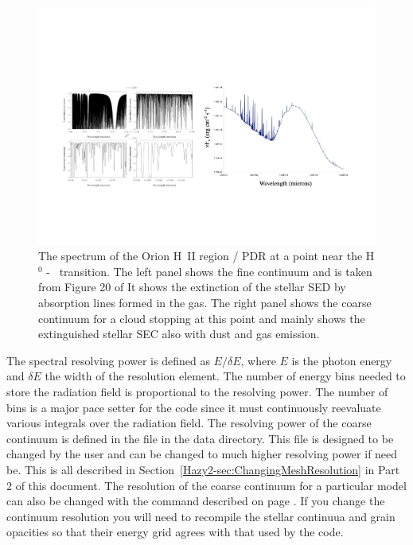 \begin{figure}
\centering
\includegraphics[scale=0.6]{CoarseFineContinua}
\caption[Orion Spectrum]{\label{fig:CoarseFineContinua}The spectrum of the Orion H~II region / PDR
at a point near the H$^0$ - \htwo\ transition.
The left panel shows the fine continuum and is taken from Figure 20 of \citet{Shaw2005}
It shows the extinction of the stellar SED by absorption lines formed in the gas.
The right panel shows the coarse continuum for a cloud stopping at this point and
mainly shows the extinguished stellar SEC also with dust and gas emission.}
\end{figure}

The spectral resolving power is defined as $E/\delta E$, where $E$ is the
photon energy and $\delta E$ the width of the resolution element.  The number
of energy bins needed to store the radiation field is proportional to the
resolving power.  The number of bins is a major pace setter for the code since it
must continuously reevaluate various integrals over the radiation field.
The resolving power of the
coarse continuum is defined in the file 
in the data directory.
This file is designed to be changed by the user and can be
changed to much higher resolving power if need be.  This is all described in
Section~\ref{Hazy2-sec:ChangingMeshResolution} in Part 2 of this document.
The resolution of the coarse continuum for a particular model can also be changed with the 
 command described on 
page \pageref{sec:CommandSetContinuumOptions}.
If you change the continuum resolution you will need to recompile
the stellar continuua and grain opacities so that their energy grid
agrees with that used by the code.

